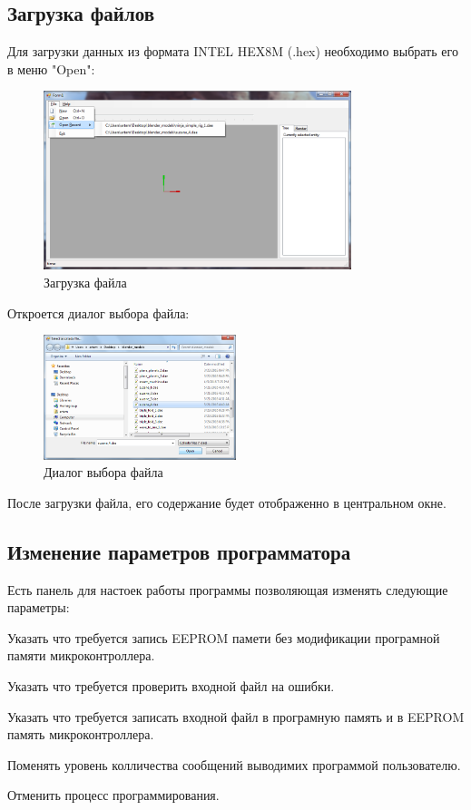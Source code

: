 \subsection{Загрузка файлов}
Для загрузки данных из формата INTEL HEX8M (.hex) необходимо выбрать его в меню "Open":

\begin{figure}[h!]
    \centering
    \includegraphics[width=0.8\textwidth]{../screenshots/file_menu_with_recent.png}
    \caption{Загрузка файла}
\end{figure}

Откроется диалог выбора файла:
\begin{figure}[h!]
    \centering
    \includegraphics[width=0.5\textwidth]{../screenshots/open_file_dialog.png}
    \caption{Диалог выбора файла}
\end{figure}

После загрузки файла, его содержание будет отображенно в центральном окне.

\subsection{Изменение параметров программатора}
Есть панель для настоек работы программы позволяющая изменять следующие параметры:
\begin{my_enumerate}
\item Указать что требуется запись EEPROM памети без модификации програмной памяти микроконтроллера.
\item Указать что требуется проверить входной файл на ошибки.
\item Указать что требуется записать входной файл в програмную память и в EEPROM память микроконтроллера.
\item Поменять уровень колличества сообщений выводимих программой пользователю.
\item Отменить процесс программирования.
\end{my_enumerate}


